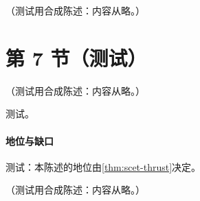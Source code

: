 \begin{example}\label{ex:scet-thrust-oneloop}
（测试用合成陈述：内容从略。）
\end{example}

\section{第 7 节（测试）}\label{sec:scet-rg}

\begin{proposition}\label{prop:scet-ll}
（测试用合成陈述：内容从略。）
\end{proposition}
\begin{proofsketch}测试。\end{proofsketch}
\paragraph{地位与缺口}测试：本陈述的地位由\cref{thm:scet-thrust}决定。

\begin{remark}\label{rem:scet-assumptions}
（测试用合成陈述：内容从略。）
\end{remark}
